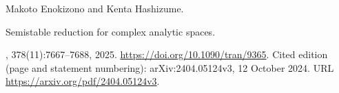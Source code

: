Makoto Enokizono and Kenta Hashizume.

\newblock Semistable reduction for complex analytic spaces.

, 378(11):7667--7688, 2025.
\newblock \url{https://doi.org/10.1090/tran/9365}.
\newblock Cited edition (page and statement numbering): arXiv:2404.05124v3, 12 October 2024.
\newblock URL \url{https://arxiv.org/pdf/2404.05124v3}.

